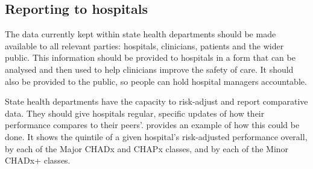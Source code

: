 \documentclass[FrontPage]{grattan}
\begin{document}
\subsection{Reporting to hospitals }\label{subsec:reporting-to-hospitals}

The data currently kept within state health departments should be made available to all relevant parties: hospitals, clinicians, patients and the wider public.
This information should be provided to hospitals in a form that can be analysed and then used to help clinicians improve the safety of care.
It should also be provided to the public, so people can hold hospital managers accountable.

State health departments have the capacity to risk-adjust and report comparative data.
They should give hospitals regular, specific updates of how their performance compares to their peers'.
 provides an example of how this could be done.
It shows the quintile of a given hospital's risk-adjusted performance overall, by each of the Major CHADx and CHAPx classes, and by each of the Minor CHADx+ classes.
\end{document}
